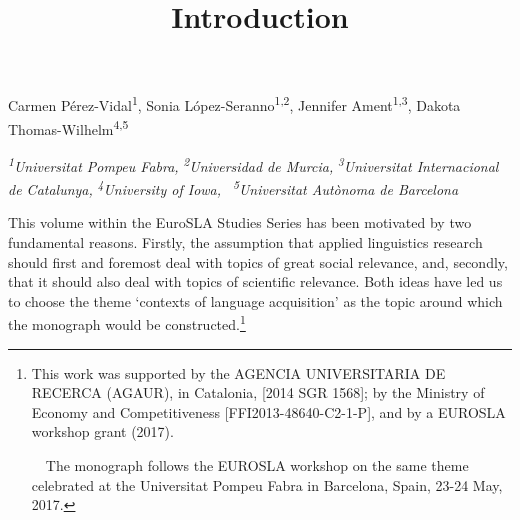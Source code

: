
\title{Introduction}
\maketitle

\begin{styleStandard}
Carmen Pérez-Vidal\textsuperscript{1}, Sonia López-Seranno\textsuperscript{1,2}, Jennifer Ament\textsuperscript{1,3}, Dakota Thomas-Wilhelm\textsuperscript{4,5}
\end{styleStandard}

\begin{styleStandard}
\textit{\textsuperscript{1}}\textit{Universitat Pompeu Fabra, }\textit{\textsuperscript{2}}\textit{Universidad de Murcia, }\textit{\textsuperscript{3}}\textit{Universitat Internacional de Catalunya, }\textit{\textsuperscript{4}}\textit{University of Iowa,}\textit{\textsuperscript{ }}\textit{\ }\textit{\textsuperscript{5}}\textit{Universitat Autònoma de Barcelona}
\end{styleStandard}

\begin{styleStandard}
This volume within the EuroSLA Studies Series has been motivated by two fundamental reasons. Firstly, the assumption that applied linguistics research should first and foremost deal with topics of great social relevance, and, secondly, that it should also deal with topics of scientific relevance. Both ideas have led us to choose the theme ‘contexts of language acquisition’ as the topic around which the monograph would be constructed.\footnote{ This work was supported by the AGENCIA UNIVERSITARIA DE RECERCA (AGAUR), in Catalonia, [2014 SGR 1568]; by the Ministry of Economy and Competitiveness [FFI2013-48640-C2-1-P], and by a EUROSLA workshop grant (2017). \par \ \ The monograph follows the EUROSLA workshop on the same theme celebrated at the Universitat Pompeu Fabra in Barcelona, Spain, 23-24 May, 2017.}
\end{styleStandard}

